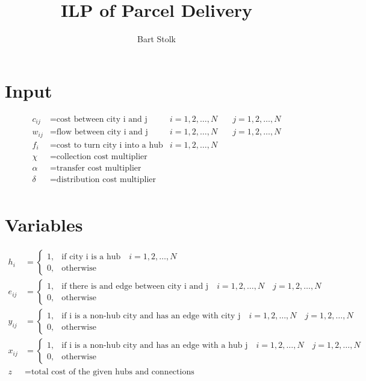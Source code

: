 \documentclass[11pt]{article} %
\title{ILP of Parcel Delivery}
\author{Bart Stolk}
\begin{document}
\maketitle

\section{Input}
\begin{align*}
c_{ij} &= \text{cost between city i and j}  &i=1,2,\ldots,N \quad& j=1,2,\ldots,N\\
w_{ij} &= \text{flow between city i and j} &i=1,2,\ldots,N \quad& j=1,2,\ldots,N\\
f_{i} &= \text{cost to turn city i into a hub} &i=1,2,\ldots,N \quad\\
\chi &= \text{collection cost multiplier} \\
\alpha &= \text{transfer cost multiplier} \\
\delta &= \text{distribution cost multiplier} \\
\end{align*}

\section{Variables}
\begin{align*}
h_{i} &=
\begin{cases} 
1, & \text{if city i is a hub} \quad i=1,2,\ldots,N \\ 
0, & \text{otherwise} 
\end{cases} \\ 
e_{ij} &=
\begin{cases} 
1, & \text{if there is and edge between city i and j} \quad i=1,2,\ldots,N \quad j=1,2,\ldots,N  \\ 
0, & \text{otherwise} 
\end{cases} \\
y_{ij} &=
\begin{cases}
1, & \text{if i is a non-hub city and has an edge with city j} \quad i=1,2,\ldots,N \quad j=1,2,\ldots,N \\
0, & \text{otherwise} 
\end{cases} \\
x_{ij} &=
\begin{cases}
1, & \text{if i is a non-hub city and has an edge with a hub j} \quad i=1,2,\ldots,N \quad j=1,2,\ldots,N \\
0, & \text{otherwise} 
\end{cases} \\
z &= \text{total cost of the given hubs and connections}
\end{align*}
\end{document}
